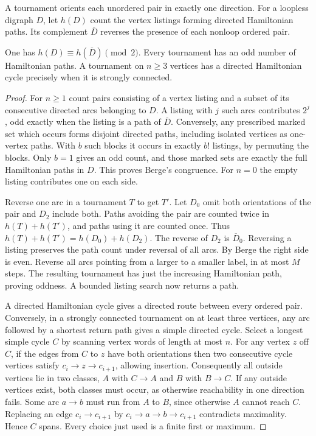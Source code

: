 A tournament orients each unordered pair in exactly one direction. For a loopless digraph $D$, let $h(D)$ count the vertex listings forming directed Hamiltonian paths. Its complement $\overline D$ reverses the presence of each nonloop ordered pair.

\begin{theorem}\label{result22}\label{thm:graph-tournaments}
One has $h(D)\equiv h(\overline D)\pmod2$. Every tournament has an odd number of Hamiltonian paths. A tournament on $n\ge3$ vertices has a directed Hamiltonian cycle precisely when it is strongly connected.
\end{theorem}
\begin{proof}
For $n\ge1$ count pairs consisting of a vertex listing and a subset of its consecutive directed arcs belonging to $D$. A listing with $j$ such arcs contributes $2^j$, odd exactly when the listing is a path of $\overline D$. Conversely, any prescribed marked set which occurs forms disjoint directed paths, including isolated vertices as one-vertex paths. With $b$ such blocks it occurs in exactly $b!$ listings, by permuting the blocks. Only $b=1$ gives an odd count, and those marked sets are exactly the full Hamiltonian paths in $D$. This proves Berge's congruence. For $n=0$ the empty listing contributes one on each side.

Reverse one arc in a tournament $T$ to get $T'$. Let $D_0$ omit both orientations of the pair and $D_2$ include both. Paths avoiding the pair are counted twice in $h(T)+h(T')$, and paths using it are counted once. Thus $h(T)+h(T')=h(D_0)+h(D_2)$. The reverse of $D_2$ is $\overline D_0$. Reversing a listing preserves the path count under reversal of all arcs. By Berge the right side is even. Reverse all arcs pointing from a larger to a smaller label, in at most $M$ steps. The resulting tournament has just the increasing Hamiltonian path, proving oddness. A bounded listing search now returns a path.

A directed Hamiltonian cycle gives a directed route between every ordered pair. Conversely, in a strongly connected tournament on at least three vertices, any arc followed by a shortest return path gives a simple directed cycle. Select a longest simple cycle $C$ by scanning vertex words of length at most $n$. For any vertex $z$ off $C$, if the edges from $C$ to $z$ have both orientations then two consecutive cycle vertices satisfy $c_i\to z\to c_{i+1}$, allowing insertion. Consequently all outside vertices lie in two classes, $A$ with $C\to A$ and $B$ with $B\to C$. If any outside vertices exist, both classes must occur, as otherwise reachability in one direction fails. Some arc $a\to b$ must run from $A$ to $B$, since otherwise $A$ cannot reach $C$. Replacing an edge $c_i\to c_{i+1}$ by $c_i\to a\to b\to c_{i+1}$ contradicts maximality. Hence $C$ spans. Every choice just used is a finite first or maximum.
\end{proof}

